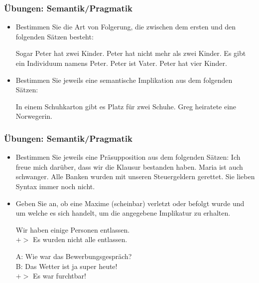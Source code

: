 \begin{frame}
\frametitle{Übungen: Semantik/Pragmatik}

\begin{itemize}
	\item Bestimmen Sie die Art von Folgerung, die zwischen dem ersten und den folgenden Sätzen besteht:
	
	\eal 
	\ex Sogar Peter hat zwei Kinder. 
	\ex Peter hat nicht mehr als zwei Kinder.
	\ex Es gibt ein Individuum namens Peter.
	\ex Peter ist Vater.
	\ex Peter hat vier Kinder.
	\zl
	
	\item Bestimmen Sie jeweils eine semantische Implikation aus dem folgenden Sätzen:
	
	\eal
	\ex In einem Schuhkarton gibt es Platz für zwei Schuhe.
	\ex Greg heiratete eine Norwegerin.
	\zl
		
\end{itemize}

\end{frame}


\begin{frame}
\frametitle{Übungen: Semantik/Pragmatik}

\begin{itemize}
	
	\item Bestimmen Sie jeweils eine Präsupposition aus dem folgenden Sätzen:
	\eal
	\ex Ich freue mich darüber, dass wir die Klausur bestanden haben.
	\ex Maria ist auch schwanger.
	\ex Alle Banken wurden mit unseren Steuergeldern gerettet.
	\ex Sie lieben Syntax immer noch nicht.
	\zl

	\item Geben Sie an, ob eine Maxime (scheinbar) verletzt oder befolgt wurde und um welche es sich handelt, um die angegebene Implikatur zu erhalten.
	
	\ea Wir haben einige Personen entlassen.\\
	$+>$ Es wurden nicht alle entlassen.
	\z
	
	\ea A: Wie war das Bewerbungsgespräch?\\
	B: Das Wetter ist ja super heute!\\
	$+>$ Es war furchtbar!
	\z
		
\end{itemize}

\end{frame}
